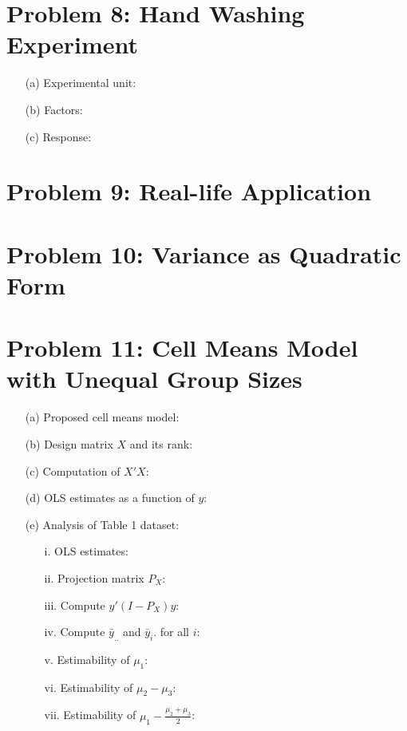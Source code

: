 \documentclass[10pt, oneside]{article}
\begin{document}
\section*{Problem 8: Hand Washing Experiment}
\begin{itemize}
	\item[(a)] Experimental unit:
	\item[(b)] Factors:
	\item[(c)] Response:
\end{itemize}

\section*{Problem 9: Real-life Application}

\section*{Problem 10: Variance as Quadratic Form}

\section*{Problem 11: Cell Means Model with Unequal Group Sizes}
\begin{itemize}
	\item[(a)] Proposed cell means model:
	\item[(b)] Design matrix $X$ and its rank:
	\item[(c)] Computation of $X'X$:
	\item[(d)] OLS estimates as a function of $y$:
	\item[(e)] Analysis of Table 1 dataset:
	\begin{itemize}
		\item[i.] OLS estimates:
		\item[ii.] Projection matrix $P_X$:
		\item[iii.] Compute $y'(I - P_X)y$:
		\item[iv.] Compute $\bar{y}_{..}$ and $\bar{y}_i.$ for all $i$:
		\item[v.] Estimability of $\mu_1$:
		\item[vi.] Estimability of $\mu_2 - \mu_3$:
		\item[vii.] Estimability of $\mu_1 - \frac{\mu_2 + \mu_3}{2}$:
	\end{itemize}
\end{itemize}
\end{document}
